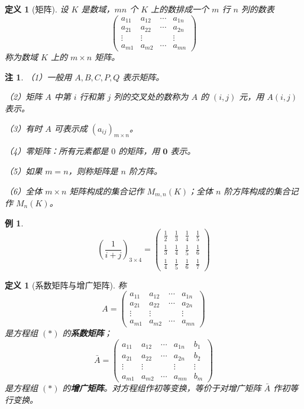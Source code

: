 \documentclass[UTF8,11pt]{ctexart}
\theoremstyle{cnthm}
\newtheorem{defn}[thm]{定义}
\newtheorem{rem}[thm]{注}
\newtheorem{exa}[thm]{例}
\begin{document}
\begin{defn}[矩阵]
设 $K$ 是数域，$mn$ 个 $K$ 上的数排成一个 $m$ 行 $n$ 列的数表
\[
\begin{pmatrix}
a_{11} & a_{12} & \cdots & a_{1n}\\
a_{21} & a_{22} & \cdots & a_{2n}\\
\vdots & \vdots & & \vdots\\
a_{m1} & a_{m2} & \cdots & a_{mn}
\end{pmatrix}
\]
称为数域 $K$ 上的 $m\times n$ 矩阵。
\end{defn}

\begin{rem}
（1）一般用 $A,B,C,P,Q$ 表示矩阵。

（2）矩阵 $A$ 中第 $i$ 行和第 $j$ 列的交叉处的数称为 $A$ 的 $(i,j)$ 元，用 $A(i,j)$ 表示。

（3）有时 $A$ 可表示成 $(a_{ij})_{m\times n}$。

（4）零矩阵：所有元素都是 $0$ 的矩阵，用 $\mathbf{0}$ 表示。

（5）如果 $m=n$，则称矩阵是 $n$ 阶方阵。

（6）全体 $m\times n$ 矩阵构成的集合记作 $M_{m,n}(K)$；全体 $n$ 阶方阵构成的集合记作 $M_n(K)$。
\end{rem}

\begin{exa}
\[
\left(\frac{1}{i+j}\right)_{3\times 4}
=
\begin{pmatrix}
\frac12 & \frac13 & \frac14 & \frac15\\[2pt]
\frac13 & \frac14 & \frac15 & \frac16\\[2pt]
\frac14 & \frac15 & \frac16 & \frac17
\end{pmatrix}
\]
\end{exa}

\begin{defn}[系数矩阵与增广矩阵]
称
\[
A=
\begin{pmatrix}
a_{11} & a_{12} & \cdots & a_{1n}\\
a_{21} & a_{22} & \cdots & a_{2n}\\
\vdots & \vdots & & \vdots\\
a_{m1} & a_{m2} & \cdots & a_{mn}
\end{pmatrix}
\]
是方程组 $(*)$ 的\textbf{系数矩阵}；
\[
\bar{A}=
\left(\begin{array}{cccc|c}
a_{11} & a_{12} & \cdots & a_{1n} & b_1\\
a_{21} & a_{22} & \cdots & a_{2n} & b_2\\
\vdots & \vdots & & \vdots & \vdots\\
a_{m1} & a_{m2} & \cdots & a_{mn} & b_m
\end{array}\right)
\]
是方程组 $(*)$ 的\textbf{增广矩阵}。对方程组作初等变换，等价于对增广矩阵 $\bar{A}$ 作初等行变换。
\end{defn}
\end{document}
